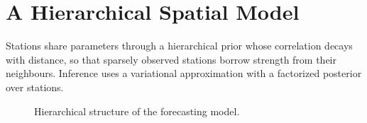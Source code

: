 \chapter{A Hierarchical Spatial Model}
\label{ch:method}

Stations share parameters through a hierarchical prior whose correlation decays with distance, so
that sparsely observed stations borrow strength from their neighbours. Inference uses a
variational approximation with a factorized posterior over stations.

\begin{figure}[htbp]
  \centering
  \caption{Hierarchical structure of the forecasting model.}
  \label{fig:hier}
\end{figure}
